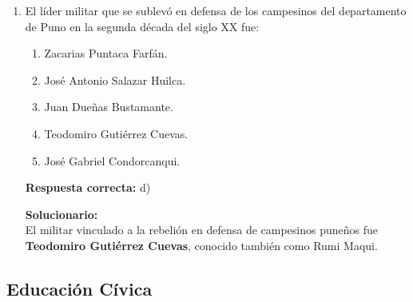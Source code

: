 \begin{enumerate}
	\vspace{2mm}
	\textbf{Solucionario:}\\
	Durante ese gobierno se creó el \textbf{Centro de Altos Estudios Militares (CAEM)}.
	

	
	\vspace{6mm}
	
	\item El líder militar que se sublevó en defensa de los campesinos del departamento de Puno en la segunda década del siglo XX fue:
	\begin{enumerate}[label=\alph*)]
		\item Zacarias Puntaca Farfán.
		\item José Antonio Salazar Huilca.
		\item Juan Dueñas Bustamante.
		\item Teodomiro Gutiérrez Cuevas.
		\item José Gabriel Condorcanqui.
	\end{enumerate}
	\textbf{Respuesta correcta:} d)
	
	\vspace{2mm}
	\textbf{Solucionario:}\\
	El militar vinculado a la rebelión en defensa de campesinos puneños fue \textbf{Teodomiro Gutiérrez Cuevas}, conocido también como Rumi Maqui.
	

	
	\vspace{6mm}
\end{enumerate}

\subsection*{Educación Cívica}

